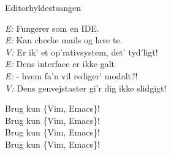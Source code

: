 \begin{song}{Editorhyldestsangen}
  \begin{SBVerse}
    \emph{E:} Fungerer som en IDE.\\
    \emph{E:} Kan checke mails og lave te.\\
    \emph{V:} Er ik’ et op’rativsystem, det’ tyd’ligt!\\
    \emph{E:} Dens interface er ikke galt\\
    \emph{E:} - hvem fa’n vil rediger’ modalt?!\\
    \emph{V:} Dens genvejstaster gi’r dig ikke slidgigt!
  \end{SBVerse}

  \begin{SBChorus}
    Brug kun \{Vim, Emacs\}!\\
    Brug kun \{Vim, Emacs\}!\\
    Brug kun \{Vim, Emacs\}!\\
    Brug kun \{Vim, Emacs\}!
  \end{SBChorus}
\end{song}